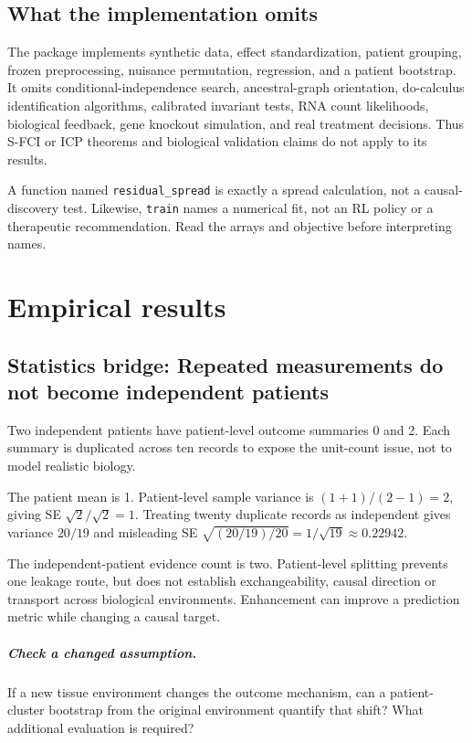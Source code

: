 \documentclass[11pt,oneside]{scrbook}
\begin{document}
\section{What the implementation omits}
The package implements synthetic data, effect standardization, patient grouping,
frozen preprocessing, nuisance permutation, regression, and a patient bootstrap.
It omits conditional-independence search, ancestral-graph orientation, do-calculus
identification algorithms, calibrated invariant tests, RNA count likelihoods, biological
feedback, gene knockout simulation, and real treatment decisions. Thus S-FCI or ICP
theorems and biological validation claims do not apply to its results.

\begin{pitfall}
A function named \texttt{residual\_spread} is exactly a spread calculation, not a
causal-discovery test. Likewise, \texttt{train} names a numerical fit, not an RL policy
or a therapeutic recommendation. Read the arrays and objective before interpreting names.
\end{pitfall}

\chapter{Empirical results}

\section{Statistics bridge: Repeated measurements do not become independent patients}
\begin{example}
Two independent patients have patient-level outcome summaries 0 and 2. Each summary is duplicated across ten records to expose the unit-count issue, not to model realistic biology.

The patient mean is 1. Patient-level sample variance is $(1+1)/(2-1)=2$, giving SE $\sqrt2/\sqrt2=1$. Treating twenty duplicate records as independent gives variance $20/19$ and misleading SE $\sqrt{(20/19)/20}=1/\sqrt{19}\approx0.22942$.
\end{example}
The independent-patient evidence count is two. Patient-level splitting prevents one leakage route, but does not establish exchangeability, causal direction or transport across biological environments. Enhancement can improve a prediction metric while changing a causal target.

\paragraph{Check a changed assumption.} If a new tissue environment changes the outcome mechanism, can a patient-cluster bootstrap from the original environment quantify that shift? What additional evaluation is required?
\end{document}
